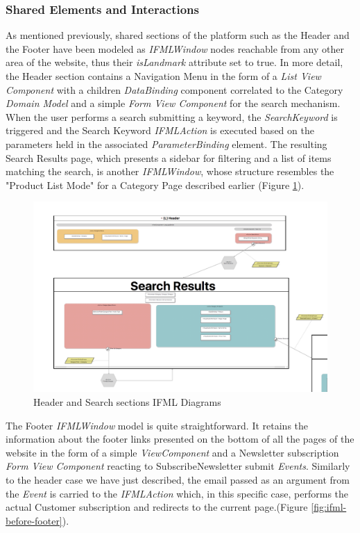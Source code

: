 \subsubsection{Shared Elements and Interactions}

As mentioned previously, shared sections of the platform such as the Header and the Footer have been modeled as \textit{IFMLWindow} nodes reachable from any other area of the website, thus their \textit{isLandmark} attribute set to true. In more detail, the Header section contains a Navigation Menu in the form of a \textit{List View Component} with a children \textit{DataBinding} component correlated to the Category \textit{Domain Model} and a simple \textit{Form View Component} for the search mechanism. When the user performs a search submitting a keyword, the \textit{SearchKeyword} is triggered and the Search Keyword \textit{IFMLAction} is executed based on the parameters held in the associated \textit{ParameterBinding} element.  The resulting Search Results page, which presents a sidebar for filtering and a list of items matching the search, is another \textit{IFMLWindow}, whose structure resembles the "Product List Mode" for a Category Page described earlier (Figure \ref{fig:ifml-before-header-search}).

\vspace{0.5cm}
\begin{figure}[H]
  \centering
    \includegraphics[width=12cm]{images/diagrams/before/ifml-header-search.png}
  \caption{Header and Search sections IFML Diagrams}
  \label{fig:ifml-before-header-search}
\end{figure}
\vspace{0.5cm}

The Footer \textit{IFMLWindow} model is quite straightforward. It retains the information about the footer links presented on the bottom of all the pages of the website in the form of a simple \textit{ViewComponent} and a Newsletter subscription \textit{Form View Component} reacting to SubscribeNewsletter submit \textit{Events}. Similarly to the header case we have just described, the email passed as an argument from the \textit{Event} is carried to the \textit{IFMLAction} which, in this specific case, performs the actual Customer subscription and redirects to the current page.(Figure \ref{fig:ifml-before-footer}).

